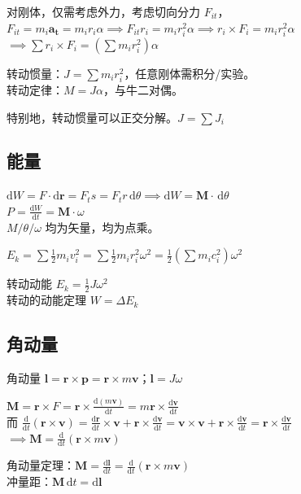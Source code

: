 \documentclass[12pt, a4paper, UTF8, openany]{ctexbook}
\newcommand{\dif}{\mathrm{d}}
\newcommand{\sdif}{\,\mathrm{d}}
\newcommand{\vect}[1]{\mathbf{#1}}
\newcommand{\vecr}{\vect{r}}
\newcommand{\vecv}{\vect{v}}
\newcommand{\vecat}{\vect{a_{t}}}
\newcommand{\vecp}{\vect{p}}
\newcommand{\vecm}{\vect{M}}
\newcommand{\vecl}{\vect{l}}
\newcommand{\cross}{\times}
\begin{document}
        对刚体，仅需考虑外力，考虑切向分力 $F_{it}$，
        $F_{it} = m_i\vecat = m_i r_i \alpha \implies F_{it} r_i = m_i r_i^2 \alpha 
        \implies r_i \cross F_i = m_i r_i^2 \alpha$ \\
        $\implies \sum r_i \cross F_i = (\sum m_i r_i^2) \alpha$

        转动惯量：$J = \sum m_i r_i^2$，任意刚体需积分/实验。\\
        转动定律：$M = J \alpha$，与牛二对偶。

        特别地，{\heiti 转动惯量可以正交分解}。$J = \sum J_i$

        \subsection{能量}
        $\dif W = F \cdot \dif \vecr = F_{t} s = F_{t} r \sdif\theta \implies \dif W = \vecm \cdot \sdif\theta$ \\
        $P = \frac{\dif W}{\dif t} = \vecm \cdot \omega$ \\
        $M/\theta/\omega$ 均为矢量，均为点乘。

        $E_{k} = \sum \frac{1}{2} m_i v_i^2 = \sum \frac{1}{2} m_i r_i^2 \omega^2 
        = \frac{1}{2}(\sum m_i c_i^2)\omega^2$

        转动动能 $E_{k} = \frac{1}{2} J \omega^2$ \\
        转动的动能定理 $W = \Delta E_{k}$

        \subsection{角动量}
        角动量 $\vecl = \vecr \cross \vecp = \vecr \cross m\vecv$；$\vecl = J\omega$

        $\vecm = \vecr \cross F = \vecr \cross \frac{\dif (m\vecv)}{\dif t} 
        = m \vecr \cross \frac{\dif \vecv}{\dif t}$ \\
        而 $\frac{\dif}{\dif t}(\vecr \cross \vecv) = \frac{\dif \vecr}{\dif t} \cross \vecv + 
        \vecr \cross \frac{\dif \vecv}{\dif t} = \vecv \cross \vecv + \vecr \cross \frac{\dif \vecv}{\dif t} 
        = \vecr \cross \frac{\dif \vecv}{\dif t}$ \\
        $\implies \vecm = \frac{\dif}{\dif t} (\vecr \cross m\vecv)$

        角动量定理：$\vecm = \frac{\dif \vecl}{\dif t} = \frac{\dif}{\dif t} (\vecr \cross m\vecv)$ \\
        冲量距：$\vecm \sdif t = \dif \vecl$
\end{document}
